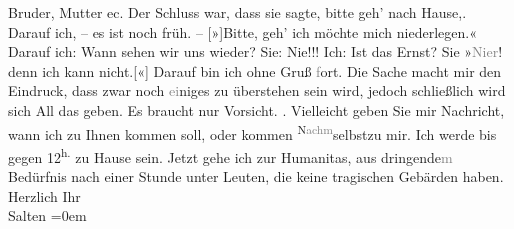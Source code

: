\begin{ledgroupsized}[t]{13cm}
                  Bruder, Mutter ec.\pend
           \pstart
           Der Schluss war, dass sie
               sagte, bitte geh’ nach Hause,. Darauf ich, – es ist noch früh. –
                  {[}»{]}Bitte, geh’ ich möchte mich niederlegen.« Darauf ich: Wann
               sehen wir uns wieder? Sie:
               Nie!!! Ich: Ist das Ernst? Sie »\textcolor{gray}{Ni{\geminationm}er}! {\pb}denn ich kann
                  nicht.{[}«{]} Darauf bin ich ohne Gruß \textcolor{gray}{f}ort.\pend
           \pstart
           Die Sache macht mir den Eindruck, dass zwar noch \textcolor{gray}{ei}niges zu
               überstehen sein wird, jedoch schließlich wird sich All das geben. Es braucht nur
               Vorsicht.\pend
           \pstart
           \label{K_L03149-2v}\label{K_L03149-2h}. Vielleicht geben Sie mir Nachricht, wann ich zu Ihnen kommen soll, oder
               kommen \substVorne{}\textsuperscript{N\textcolor{gray}{achm}}\substDazwischen{}selbst\substHinten{}{ }{\pb}zu mir. Ich werde bis gegen
                     12\textsuperscript{h.}{ }zu Hause sein.\pend
           \pstart
           Jetzt gehe ich zur Humanitas, aus
                  dringende\textcolor{gray}{m} Bedürfnis nach einer Stunde unter Leuten, die keine
               tragischen Gebärden haben.\pend
           \pstart
           Herzlich Ihr {\\[\baselineskip]}\spacefill\mbox{Salten}\pend
           \leftskip=0em{}
         
         \endnumbering{}\end{ledgroupsized}  \newcommand{\dateiname}{L03149}\newcommand{\titel}{Felix Salten an Arthur Schnitzler, [26. 1. 1895]}\newcommand{\editorInnen}{Martin Anton Müller und Laura Untner}
      